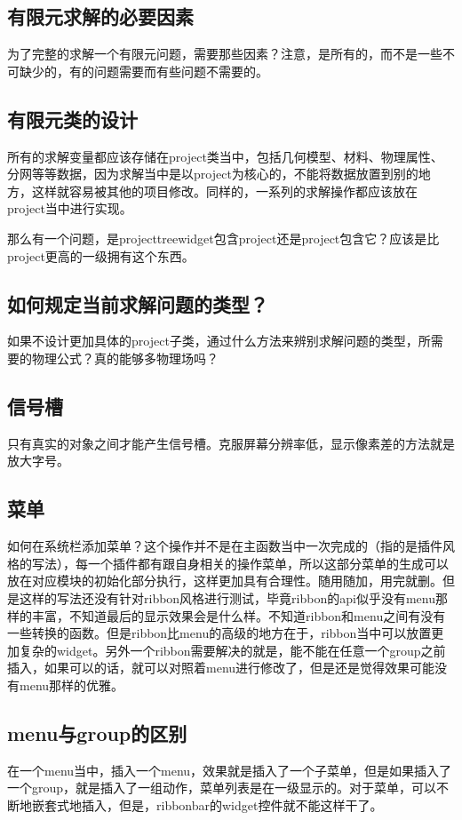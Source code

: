 \subsection{有限元求解的必要因素}
为了完整的求解一个有限元问题，需要那些因素？注意，是所有的，而不是一些不可缺少的，有的问题需要而有些问题不需要的。
\subsection{有限元类的设计}
所有的求解变量都应该存储在project类当中，包括几何模型、材料、物理属性、分网等等数据，因为求解当中是以project为核心的，不能将数据放置到别的地方，这样就容易被其他的项目修改。同样的，一系列的求解操作都应该放在project当中进行实现。

那么有一个问题，是projecttreewidget包含project还是project包含它？应该是比project更高的一级拥有这个东西。
\subsection{如何规定当前求解问题的类型？}
如果不设计更加具体的project子类，通过什么方法来辨别求解问题的类型，所需要的物理公式？真的能够多物理场吗？
\subsection{信号槽}
只有真实的对象之间才能产生信号槽。克服屏幕分辨率低，显示像素差的方法就是放大字号。
\subsection{菜单}
如何在系统栏添加菜单？这个操作并不是在主函数当中一次完成的（指的是插件风格的写法），每一个插件都有跟自身相关的操作菜单，所以这部分菜单的生成可以放在对应模块的初始化部分执行，这样更加具有合理性。随用随加，用完就删。但是这样的写法还没有针对ribbon风格进行测试，毕竟ribbon的api似乎没有menu那样的丰富，不知道最后的显示效果会是什么样。不知道ribbon和menu之间有没有一些转换的函数。但是ribbon比menu的高级的地方在于，ribbon当中可以放置更加复杂的widget。另外一个ribbon需要解决的就是，能不能在任意一个group之前插入，如果可以的话，就可以对照着menu进行修改了，但是还是觉得效果可能没有menu那样的优雅。
\subsection{menu与group的区别}
在一个menu当中，插入一个menu，效果就是插入了一个子菜单，但是如果插入了一个group，就是插入了一组动作，菜单列表是在一级显示的。对于菜单，可以不断地嵌套式地插入，但是，ribbonbar的widget控件就不能这样干了。
